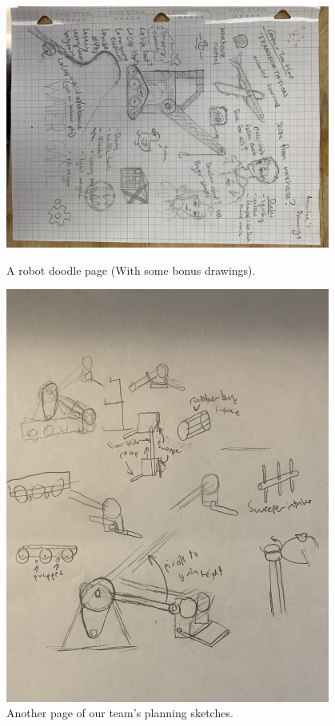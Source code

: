 \begin{figure}[ht]
\centering
\begin{minipage}[b]{.48\textwidth}
  \centering
  \includegraphics[width=0.95\textwidth]{Meetings/September/09-21-21/9-19-21_Team_Image3 - Nathan Forrer.JPG}
  \caption{A robot doodle page (With some bonus drawings).}
  \label{fig:092122_3}
\end{minipage}%
\hfill%
\begin{minipage}[b]{.48\textwidth}
  \centering
  \includegraphics[width=0.95\textwidth]{Meetings/September/09-21-21/9-19-21_Team_Image4 - Nathan Forrer.JPG}
  \caption{Another page of our team's planning sketches.}
  \label{fig:092122_4}
\end{minipage}
\end{figure}

